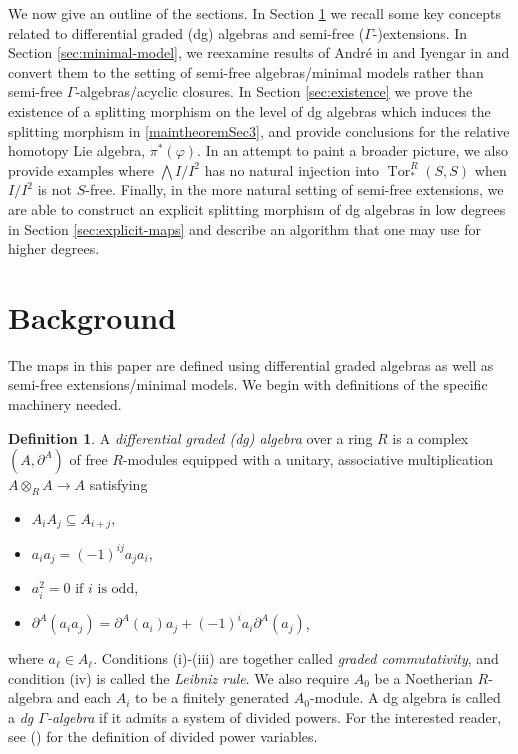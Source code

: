\documentclass{amsart}
\theoremstyle{definition}
\newtheorem{defn}[theorem]{Definition}
\theoremstyle{remark}
\newcommand{\Tor}{\ensuremath{\operatorname{Tor}}}
\begin{document}
We now give an outline of the sections. In Section \ref{sec:background} we recall some key concepts related to differential graded (dg) algebras and semi-free ($\Gamma$-)extensions. In Section \ref{sec:minimal-model}, we reexamine results of André in \cite{André1982} and Iyengar in \cite{Iyengar2001} and convert them to the setting of semi-free algebras/minimal models rather than semi-free $\Gamma$-algebras/acyclic closures. In Section \ref{sec:existence} we prove the existence of a splitting morphism on the level of dg algebras which induces the splitting morphism in \cref{maintheoremSec3}, and provide conclusions for the relative homotopy Lie algebra, $\pi^*(\varphi)$. In an attempt to paint a broader picture, we also provide examples where $\bigwedge I/I^2$ has no natural injection into $\Tor_{*}^{R}(S,S)$ when $I/I^2$ is not $S$-free. Finally, in the more natural setting of semi-free extensions, we are able to construct an explicit splitting morphism of dg algebras in low degrees in Section \ref{sec:explicit-maps} and describe an algorithm that one may use for higher degrees.

\section{Background}
\label{sec:background}

The maps in this paper are defined using differential graded algebras as well as semi-free extensions/minimal models. We begin with definitions of the specific machinery needed.



\begin{defn}
A \textit{differential graded (dg) algebra} over a ring $R$ is a complex $(A,\partial^A)$ of free $R$-modules equipped with a unitary, associative multiplication $A \otimes_R A \to A$ satisfying 
\begin{itemize}
    \item[(i)] $A_iA_j \subseteq A_{i+j}$,
    \item[(ii)] $a_ia_j=(-1)^{ij}a_ja_i$,
    \item[(iii)] $a_i^2=0 \text{ if $i$ is odd}$,
    \item[(iv)] $\partial^A(a_ia_j)=\partial^A(a_i)a_j+(-1)^{i}a_i\partial^A(a_j)$,
\end{itemize}
where $a_\ell \in A_\ell$.  Conditions (i)-(iii) are together called \textit{graded commutativity}, and condition (iv) is called the \textit{Leibniz rule}. We also require $A_0$ be a Noetherian $R$-algebra and each $A_i$ to be a finitely generated $A_0$-module. A dg algebra is called a \emph{dg $\Gamma$-algebra} if it admits a system of divided powers. For the interested reader, see (\cite{AvramovIFR}) for the definition of divided power variables. 
\end{defn}
\end{document}
